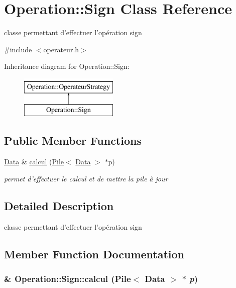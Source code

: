\hypertarget{classOperation_1_1Sign}{
\section{Operation::Sign Class Reference}
\label{classOperation_1_1Sign}
}


classe permettant d'effectuer l'opération sign  




{\ttfamily \#include $<$operateur.h$>$}

Inheritance diagram for Operation::Sign:\begin{figure}[H]
\begin{center}
\leavevmode
\includegraphics[height=2cm]{classOperation_1_1Sign}
\end{center}
\end{figure}
\subsection*{Public Member Functions}
\begin{DoxyCompactItemize}
\item 
\hyperlink{classNombre_1_1Data}{Data} \& \hyperlink{classOperation_1_1Sign_a5e48e8f57458001887196d09c2107fee}{calcul} (\hyperlink{classPile}{Pile}$<$ \hyperlink{classNombre_1_1Data}{Data} $>$ $\ast$p)
\begin{DoxyCompactList}\small\item\em permet d'effectuer le calcul et de mettre la pile à jour \item\end{DoxyCompactList}\end{DoxyCompactItemize}


\subsection{Detailed Description}
classe permettant d'effectuer l'opération sign 

\subsection{Member Function Documentation}
\hypertarget{classOperation_1_1Sign_a5e48e8f57458001887196d09c2107fee}{
\subsubsection[{calcul}]{\& Operation::Sign::calcul ({\bf Pile}$<$ {\bf Data} $>$ $\ast$ {\em p})}}
\label{classOperation_1_1Sign_a5e48e8f57458001887196d09c2107fee}


